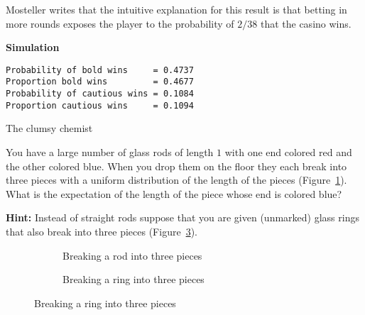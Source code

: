 Mosteller writes that the intuitive explanation for this result is that betting in more rounds exposes the player to the probability of $2/38$ that the casino wins.

\textbf{Simulation}
\begin{verbatim}
Probability of bold wins     = 0.4737
Proportion bold wins         = 0.4677
Probability of cautious wins = 0.1084
Proportion cautious wins     = 0.1094
\end{verbatim}




\begin{prob}{The clumsy chemist}

You have a large number of glass rods of length $1$ with one end colored red and the other colored blue. When you drop them on the floor they each break into three pieces with a uniform distribution of the length of the pieces (Figure~\ref{f.rod1}). What is the expectation of the length of the piece whose end is colored blue?

\textbf{Hint:}
Instead of straight rods suppose that you are given (unmarked) glass rings that also break into three pieces (Figure~\ref{f.rod2}).
\begin{figure}[tb]
\begin{center}
\begin{subfigure}{.4\textwidth}
\caption{Breaking a rod into three pieces}\label{f.rod1}
\end{subfigure}
\hspace{3em}
\begin{subfigure}[b]{.4\textwidth}
\caption{Breaking a ring into three pieces}\label{f.rod2}
\end{subfigure}
\end{center}
\end{figure}
\end{prob}

